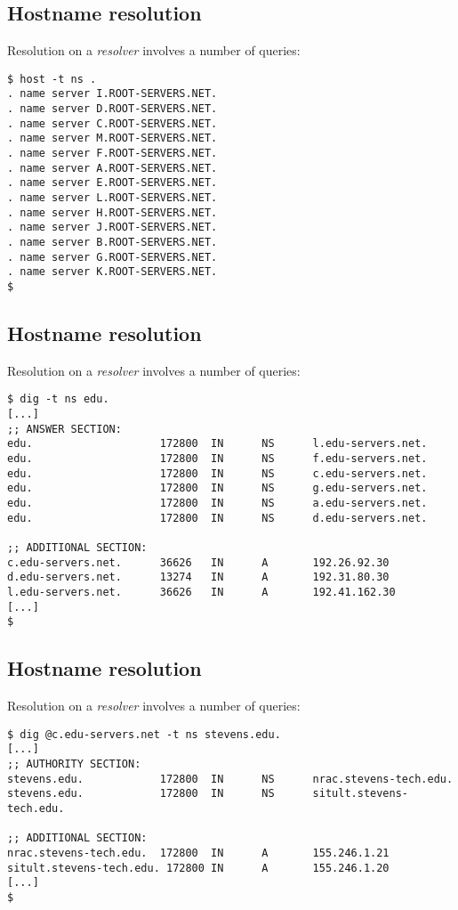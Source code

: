 \documentclass[xga]{xdvislides}
\begin{document}
\subsection{Hostname resolution}
Resolution on a {\em resolver} involves a number of queries:
\begin{verbatim}
$ host -t ns .
. name server I.ROOT-SERVERS.NET.
. name server D.ROOT-SERVERS.NET.
. name server C.ROOT-SERVERS.NET.
. name server M.ROOT-SERVERS.NET.
. name server F.ROOT-SERVERS.NET.
. name server A.ROOT-SERVERS.NET.
. name server E.ROOT-SERVERS.NET.
. name server L.ROOT-SERVERS.NET.
. name server H.ROOT-SERVERS.NET.
. name server J.ROOT-SERVERS.NET.
. name server B.ROOT-SERVERS.NET.
. name server G.ROOT-SERVERS.NET.
. name server K.ROOT-SERVERS.NET.
$
\end{verbatim}

\subsection{Hostname resolution}
Resolution on a {\em resolver} involves a number of queries:
\begin{verbatim}
$ dig -t ns edu.
[...]
;; ANSWER SECTION:
edu.                    172800  IN      NS      l.edu-servers.net.
edu.                    172800  IN      NS      f.edu-servers.net.
edu.                    172800  IN      NS      c.edu-servers.net.
edu.                    172800  IN      NS      g.edu-servers.net.
edu.                    172800  IN      NS      a.edu-servers.net.
edu.                    172800  IN      NS      d.edu-servers.net.

;; ADDITIONAL SECTION:
c.edu-servers.net.      36626   IN      A       192.26.92.30
d.edu-servers.net.      13274   IN      A       192.31.80.30
l.edu-servers.net.      36626   IN      A       192.41.162.30
[...]
$
\end{verbatim}
\Normalsize

\subsection{Hostname resolution}
Resolution on a {\em resolver} involves a number of queries:
\begin{verbatim}
$ dig @c.edu-servers.net -t ns stevens.edu.
[...]
;; AUTHORITY SECTION:
stevens.edu.            172800  IN      NS      nrac.stevens-tech.edu.
stevens.edu.            172800  IN      NS      sitult.stevens-tech.edu.

;; ADDITIONAL SECTION:
nrac.stevens-tech.edu.  172800  IN      A       155.246.1.21
sitult.stevens-tech.edu. 172800 IN      A       155.246.1.20
[...]
$
\end{verbatim}
\end{document}
